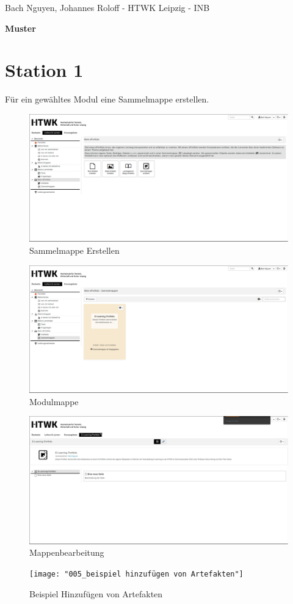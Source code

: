 \documentclass[a4paper,oneside]{scrarticle}
\begin{document}
	\begin{flushleft}
		Bach Nguyen, Johannes Roloff - HTWK Leipzig - INB
	\end{flushleft}
	\begin{center}
		\begin{LARGE}
			\textbf{Muster}
		\end{LARGE}
	\end{center}
	\section*{Station 1}
	Für ein gewähltes Modul eine Sammelmappe erstellen.
	\begin{figure}[h]
		\centering
		\includegraphics[width=0.5\linewidth]{001_sammelmappeErstellen}
		\caption{Sammelmappe Erstellen}
		\label{fig:001sammelmappeerstellen}
	\end{figure}
	\begin{figure}[h]
		\centering
		\includegraphics[width=0.5\linewidth]{002_ModulMappe}
		\caption{Modulmappe}
		\label{fig:002modulmappe}
	\end{figure}
	\begin{figure}[h]
		\centering
		\includegraphics[width=0.5\linewidth]{003_BearbeitungMappe}
		\caption{Mappenbearbeitung}
		\label{fig:003bearbeitungmappe}
	\end{figure}
	\begin{figure}[h]
		\centering
		\texttt{[image: "005\_beispiel hinzufügen von Artefakten"]}
		\caption{Beispiel Hinzufügen von Artefakten}
		\label{fig:005beispiel-hinzufugen-von-artefakten}
	\end{figure}
\end{document}
